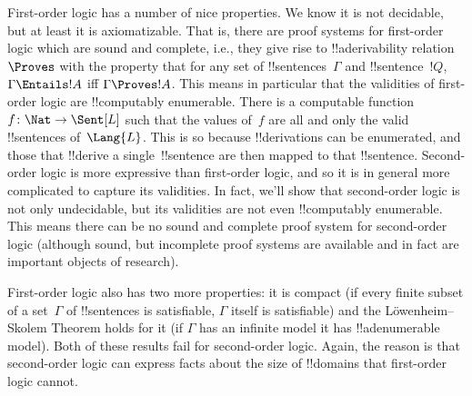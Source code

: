 \documentclass[../../../include/open-logic-section]{subfiles}
\begin{document}

First-order logic has a number of nice properties. We know it is not
decidable, but at least it is axiomatizable. That is, there are proof
systems for first-order logic which are sound and complete, i.e., they
give rise to !!a{derivability} relation~$\Proves$ with the property
that for any set of !!{sentence}s~$\Gamma$ and !!{sentence}~$!Q$,
$\Gamma \Entails !A$ iff $\Gamma \Proves !A$.  This means in
particular that the validities of first-order logic are !!{computably
  enumerable}. There is a computable function~$f\colon \Nat \to
\Sent[L]$ such that the values of~$f$ are all and only the valid
!!{sentence}s of~$\Lang{L}$. This is so because !!{derivation}s can be
enumerated, and those that !!{derive} a single~!!{sentence} are then
mapped to that !!{sentence}.  Second-order logic is more expressive
than first-order logic, and so it is in general more complicated to
capture its validities.  In fact, we'll show that second-order logic
is not only undecidable, but its validities are not even !!{computably
  enumerable}. This means there can be no sound and complete proof
system for second-order logic (although sound, but incomplete proof
systems are available and in fact are important objects of research).

First-order logic also has two more properties: it is compact (if
every finite subset of a set~$\Gamma$ of !!{sentence}s is satisfiable,
$\Gamma$ itself is satisfiable) and the L\"owenheim--Skolem Theorem
holds for it (if $\Gamma$ has an infinite model it has
!!a{denumerable} model). Both of these results fail for second-order
logic. Again, the reason is that second-order logic can express facts
about the size of !!{domain}s that first-order logic cannot.
\end{document}
